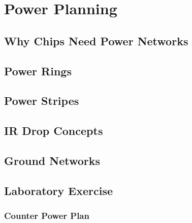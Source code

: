 \chapter{Power Planning}

\section{Why Chips Need Power Networks}

\section{Power Rings}

\section{Power Stripes}

\section{IR Drop Concepts}

\section{Ground Networks}

\section{Laboratory Exercise}

\subsection*{Counter Power Plan}
